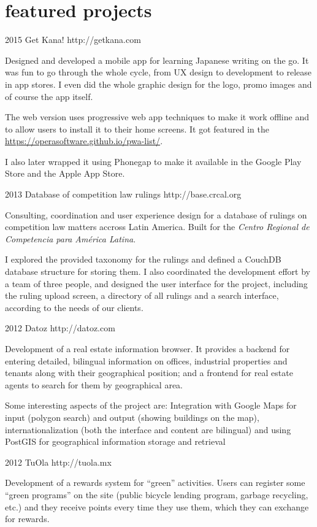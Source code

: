 \documentclass[]{friggeri-cv} %
\begin{document}
\section{featured projects}

\begin{entrylist}
\entry
{2015}
{Get Kana!}
{http://getkana.com}
{Designed and developed a mobile app for learning Japanese writing on the go. It was fun to go through the whole cycle, from UX design to development to release in app stores. I even did the whole graphic design for the logo, promo images and of course the app itself.

The web version uses progressive web app techniques to make it work offline and to allow users to install it to their home screens. It got featured in the \href{Opera Devrel Team list of Progressive Web Applications}{https://operasoftware.github.io/pwa-list/}.

I also later wrapped it using Phonegap to make it available in the Google Play Store and the Apple App Store.}
\entry
{2013}
{Database of competition law rulings}
{http://base.crcal.org}
{Consulting, coordination and user experience design for a database of rulings on competition law matters accross Latin America. Built for the \emph{Centro Regional de Competencia para América Latina}.

I explored the provided taxonomy for the rulings and defined a CouchDB database structure for storing them. I also coordinated the development effort by a team of three people, and designed the user interface for the project, including the ruling upload screen, a directory of all rulings and a search interface, according to the needs of our clients.}
\entry
{2012}
{Datoz}
{http://datoz.com}
{Development of a real estate information browser. It provides a backend for entering detailed, bilingual information on offices, industrial properties and tenants along with their geographical position; and a frontend for real estate agents to search for them by geographical area.

Some interesting aspects of the project are: Integration with Google Maps for input (polygon search) and output (showing buildings on the map), internationalization (both the interface and content are bilingual) and using PostGIS for geographical information storage and retrieval}
\entry
{2012}
{TuOla}
{http://tuola.mx}
{Development of a rewards system for “green” activities. Users can register some “green programs” on the site (public bicycle lending program, garbage recycling, etc.) and they receive points every time they use them, which they can exchange for rewards.

}
\end{entrylist}
\end{document}
